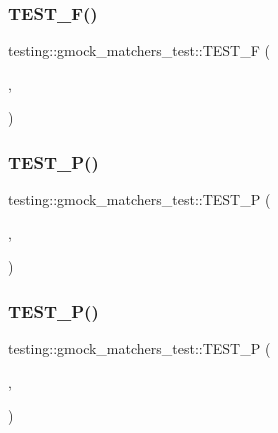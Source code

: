 \subsubsection{\texorpdfstring{TEST\_F()}{TEST\_F()}\hspace{0.1cm}{\footnotesize\ttfamily [40/40]}}
{\footnotesize\ttfamily testing\+::gmock\+\_\+matchers\+\_\+test\+::\+T\+E\+S\+T\+\_\+F (\begin{DoxyParamCaption}\item[{\mbox{\hyperlink{classtesting_1_1gmock__matchers__test_1_1BipartiteNonSquareTest}{Bipartite\+Non\+Square\+Test}}}]{,  }\item[{Simple\+Backtracking}]{ }\end{DoxyParamCaption})}

\mbox{\label{namespacetesting_1_1gmock__matchers__test_a20589d957fcfe5399e249084dbc23e82}} 
\subsubsection{\texorpdfstring{TEST\_P()}{TEST\_P()}\hspace{0.1cm}{\footnotesize\ttfamily [1/3]}}
{\footnotesize\ttfamily testing\+::gmock\+\_\+matchers\+\_\+test\+::\+T\+E\+S\+T\+\_\+P (\begin{DoxyParamCaption}\item[{\mbox{\hyperlink{classtesting_1_1gmock__matchers__test_1_1BipartiteTest}{Bipartite\+Test}}}]{,  }\item[{Exhaustive}]{ }\end{DoxyParamCaption})}

\mbox{\label{namespacetesting_1_1gmock__matchers__test_a3ac913ed55a7ac2636ae7bfce04296e9}} 
\subsubsection{\texorpdfstring{TEST\_P()}{TEST\_P()}\hspace{0.1cm}{\footnotesize\ttfamily [2/3]}}
{\footnotesize\ttfamily testing\+::gmock\+\_\+matchers\+\_\+test\+::\+T\+E\+S\+T\+\_\+P (\begin{DoxyParamCaption}\item[{\mbox{\hyperlink{classtesting_1_1gmock__matchers__test_1_1BipartiteNonSquareTest}{Bipartite\+Non\+Square\+Test}}}]{,  }\item[{Exhaustive}]{ }\end{DoxyParamCaption})}

